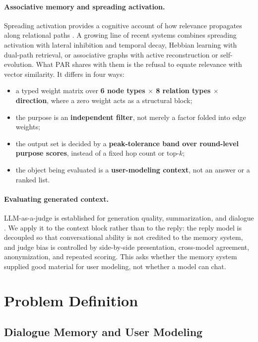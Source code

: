 \documentclass[11pt]{article}
\begin{document}
\paragraph{Associative memory and spreading activation.}
Spreading activation provides a cognitive account of how relevance propagates along relational
paths \citep{anderson1983spreading}. A growing line of recent systems combines spreading
activation with lateral inhibition and temporal decay, Hebbian learning with dual-path retrieval,
or associative graphs with active reconstruction or self-evolution. What PAR shares with them is
the refusal to equate relevance with vector similarity. It differs in four ways:

\begin{itemize}
  \item a typed weight matrix over \textbf{6 node types $\times$ 8 relation types $\times$
        direction}, where a zero weight acts as a structural block;
  \item the purpose is an \textbf{independent filter}, not merely a factor folded into edge
        weights;
  \item the output set is decided by a \textbf{peak-tolerance band over round-level purpose
        scores}, instead of a fixed hop count or top-$k$;
  \item the object being evaluated is a \textbf{user-modeling context}, not an answer or a
        ranked list.
\end{itemize}

\paragraph{Evaluating generated context.}
LLM-as-a-judge is established for generation quality, summarization, and dialogue
\citep{zheng2023judging}. We apply it to the context block rather than to the reply: the reply
model is decoupled so that conversational ability is not credited to the memory system, and
judge bias is controlled by side-by-side presentation, cross-model agreement, anonymization,
and repeated scoring. This asks whether the memory system supplied good material for user
modeling, not whether a model can chat.

\section{Problem Definition}

\subsection{Dialogue Memory and User Modeling}
\end{document}
